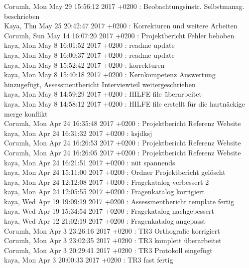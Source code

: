 Corumh, Mon May 29 15:56:12 2017 +0200 : Beobachtungsinstr. Selbstmanag. beschrieben\\
Kaya, Thu May 25 20:42:47 2017 +0200 : Korrekturen und weitere Arbeiten\\
Corumh, Sun May 14 16:07:20 2017 +0200 : Projektbericht Fehler behoben\\
kaya, Mon May 8 16:01:52 2017 +0200 : readme update\\
kaya, Mon May 8 16:00:37 2017 +0200 : readme update\\
kaya, Mon May 8 15:52:42 2017 +0200 : korrekturen\\
kaya, Mon May 8 15:40:18 2017 +0200 : Kernkompetenz Auswertung hinzugefügt, Assessmentbericht Interviewteil weitergeschrieben\\
kaya, Mon May 8 14:59:29 2017 +0200 : HILFE file überarbeitet\\
kaya, Mon May 8 14:58:12 2017 +0200 : HILFE file erstellt für die hartnäckige merge konflikt\\
Corumh, Mon Apr 24 16:35:48 2017 +0200 : Projektbericht Referenz Website\\
kaya, Mon Apr 24 16:31:32 2017 +0200 : ksjdksj\\
Corumh, Mon Apr 24 16:26:53 2017 +0200 : Projektbericht Referenz Website\\
Corumh, Mon Apr 24 16:26:05 2017 +0200 : Projektbericht Referenz Website\\
kaya, Mon Apr 24 16:21:51 2017 +0200 : nüt spannends\\
kaya, Mon Apr 24 15:11:00 2017 +0200 : Ordner Projektbericht gelöscht\\
kaya, Mon Apr 24 12:12:08 2017 +0200 : Fragekatalog verbessert 2\\
kaya, Mon Apr 24 12:05:55 2017 +0200 : Fragenkatalog korrigiert\\
kaya, Wed Apr 19 19:09:19 2017 +0200 : Assessmentbericht template fertig\\
kaya, Wed Apr 19 15:34:54 2017 +0200 : Fragekatalog nachgebessert\\
kaya, Wed Apr 12 21:02:19 2017 +0200 : Fragenkatalog angepasst\\
Corumh, Mon Apr 3 23:26:16 2017 +0200 : TR3 Orthografie korrigiert\\
Corumh, Mon Apr 3 23:02:35 2017 +0200 : TR3 komplett überarbeitet\\
Corumh, Mon Apr 3 20:29:41 2017 +0200 : TR3 Protokoll eingefügt\\
kaya, Mon Apr 3 20:00:33 2017 +0200 : TR3 fast fertig\\
